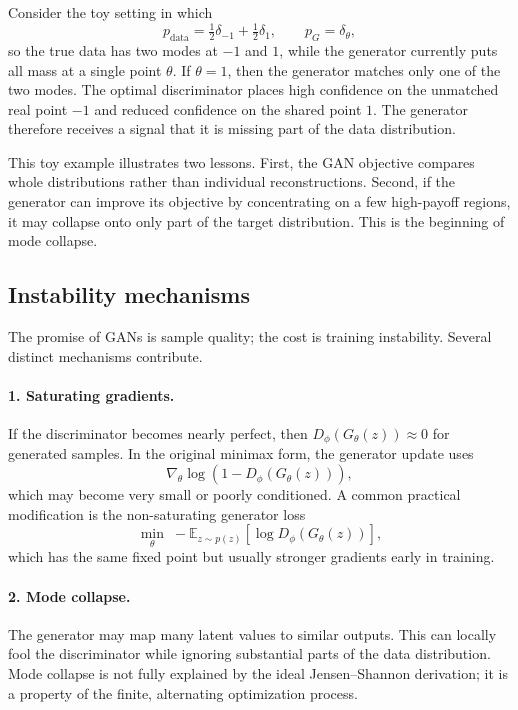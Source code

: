 Consider the toy setting in which
\[
p_{\mathrm{data}} = \tfrac12 \delta_{-1} + \tfrac12 \delta_{1},
\qquad
p_G = \delta_{\theta},
\]
so the true data has two modes at $-1$ and $1$, while the generator currently puts all mass at a single point $\theta$.
If $\theta=1$, then the generator matches only one of the two modes.
The optimal discriminator places high confidence on the unmatched real point $-1$ and reduced confidence on the shared point $1$.
The generator therefore receives a signal that it is missing part of the data distribution.

This toy example illustrates two lessons.
First, the GAN objective compares whole distributions rather than individual reconstructions.
Second, if the generator can improve its objective by concentrating on a few high-payoff regions, it may collapse onto only part of the target distribution.
This is the beginning of mode collapse.

\subsection*{Instability mechanisms}

The promise of GANs is sample quality; the cost is training instability.
Several distinct mechanisms contribute.

\paragraph{1. Saturating gradients.}
If the discriminator becomes nearly perfect, then $D_\phi(G_\theta(z))\approx 0$ for generated samples.
In the original minimax form, the generator update uses
\[
\nabla_\theta \log(1-D_\phi(G_\theta(z))),
\]
which may become very small or poorly conditioned.
A common practical modification is the non-saturating generator loss
\[
\min_\theta \; -\mathbb E_{z\sim p(z)}[\log D_\phi(G_\theta(z))],
\]
which has the same fixed point but usually stronger gradients early in training.

\paragraph{2. Mode collapse.}
The generator may map many latent values to similar outputs.
This can locally fool the discriminator while ignoring substantial parts of the data distribution.
Mode collapse is not fully explained by the ideal Jensen--Shannon derivation; it is a property of the finite, alternating optimization process.

